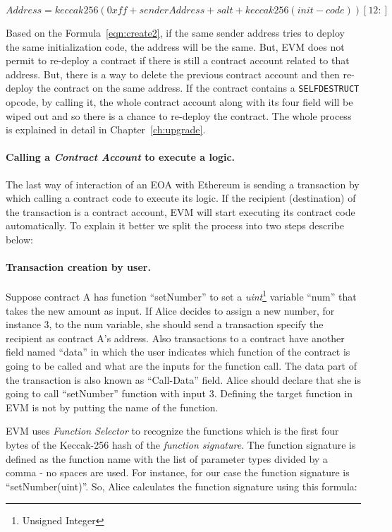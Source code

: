 \begin{equation}
    \label{eqn:create2}
    Address = keccak256(0xff + senderAddress + salt + keccak256(init-code))[12:]    
\end{equation}

Based on the Formula~\ref{eqn:create2}, if the same sender address tries to deploy the same initialization code, the address will be the same. But, EVM does not permit to re-deploy a contract if there is still a contract account related to that address. But, there is a way to delete the previous contract account and then re-deploy the contract on the same address. If the contract contains a \texttt{SELFDESTRUCT} opcode, by calling it, the whole contract account along with its four field will be wiped out and so there is a chance to re-deploy the contract. The whole process is explained in detail in Chapter~\ref{ch:upgrade}. 

\paragraph{Calling a \textit{Contract Account} to execute a logic.}
The last way of interaction of an EOA with Ethereum is sending a transaction by which calling a contract code to execute its logic. If the recipient (destination) of the transaction is a contract account, EVM will start executing its contract code automatically. To explain it better we split the process into two steps describe below:

\paragraph{Transaction creation by user. }Suppose contract A has function ``setNumber'' to set a \textit{uint}\footnote{Unsigned Integer} variable ``num'' that takes the new amount as input. If Alice decides to assign a new number, for instance 3, to the num variable, she should send a transaction specify the recipient as contract A's address. Also transactions to a contract have another field named ``data'' in which the user indicates which function of the contract is going to be called and what are the inputs for the function call. The data part of the transaction is also known as ``Call-Data'' field. Alice should declare that she is going to call ``setNumber'' function with input 3. Defining the target function in EVM is not by putting the name of the function. 

EVM uses \textit{Function Selector} to recognize the functions which is the first four bytes of the Keccak-256 hash of the \textit{function signature}. The function signature is defined as the function name with the list of parameter types divided by a comma - no spaces are used. For instance, for our case the function signature is ``setNumber(uint)''. So, Alice calculates the function signature using this formula:

